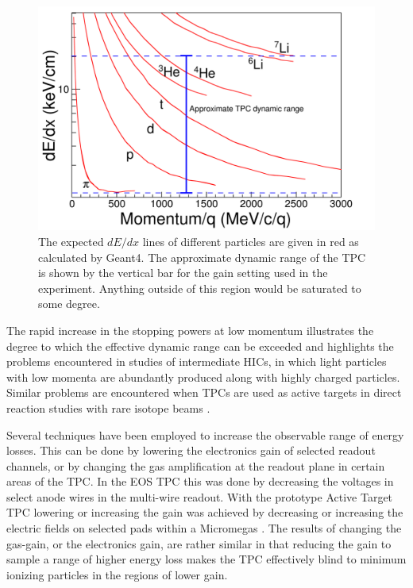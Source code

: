 \documentclass[review]{elsarticle}
\begin{document}
  
\begin{figure}[ht!]
\includegraphics[width=\linewidth]{intrographic}
\caption{The expected $dE/dx$ lines of different particles are given in red as calculated by Geant4. The approximate dynamic range of the TPC is shown by the vertical bar for the gain setting used in the experiment. Anything outside of this region would be saturated to some degree.}
\label{fig:intro}
\end{figure}

The rapid increase in the stopping powers at low momentum illustrates the degree to which the effective dynamic range can be exceeded and highlights the problems encountered in studies of intermediate HICs, in which light particles with low momenta are abundantly produced along with highly charged particles. Similar problems are encountered when TPCs are used as active targets in direct reaction studies with rare isotope beams \cite{pattpc}. 

Several techniques have been employed to increase the observable range of energy losses. This can be done by lowering the electronics gain of selected readout channels, or by changing the gas amplification at the readout plane in certain areas of the TPC. In the EOS TPC \cite{eos} this was done by decreasing the voltages in select anode wires in the multi-wire readout. With the prototype Active Target TPC lowering or increasing the gain was achieved by decreasing or increasing the electric fields on selected pads within a Micromegas \cite{pattpc}. The results of changing the gas-gain, or the electronics gain, are rather similar in that reducing the gain to sample a range of higher energy loss makes the TPC effectively blind to minimum ionizing particles in  the regions of lower gain.
\end{document}
